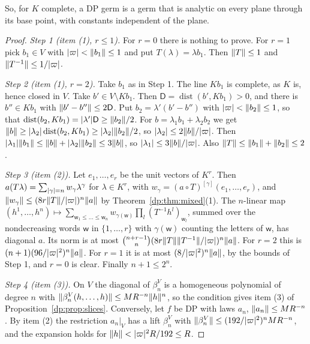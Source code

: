 So, for $K$ complete, a DP germ is a germ that is analytic on every plane through its base point, with constants independent of the plane.

\begin{proof}
\emph{Step 1 (item (1), $r\le1$).} For $r=0$ there is nothing to prove. For $r=1$ pick $b_1\in V$ with $\lvert \varpi\rvert<\lVert b_1\rVert\le1$ and put $T(\lambda)=\lambda b_1$. Then $\lVert T\rVert\le1$ and $\lVert T^{-1}\rVert\le1/\lvert \varpi\rvert$.

\emph{Step 2 (item (1), $r=2$).} Take $b_1$ as in Step 1. The line $Kb_1$ is complete, as $K$ is, hence closed in $V$. Take $b'\in V\setminus Kb_1$. Then $\mathsf D=\operatorname{dist}(b',Kb_1)>0$, and there is $b''\in Kb_1$ with $\lVert b'-b''\rVert\le2\mathsf D$. Put $b_2=\lambda'(b'-b'')$ with $\lvert \varpi\rvert<\lVert b_2\rVert\le1$, so that $\operatorname{dist}(b_2,Kb_1)=\lvert \lambda'\rvert\mathsf D\ge\lVert b_2\rVert/2$. For $b=\lambda_1b_1+\lambda_2b_2$ we get $\lVert b\rVert\ge\lvert \lambda_2\rvert\operatorname{dist}(b_2,Kb_1)\ge\lvert \lambda_2\rvert\lVert b_2\rVert/2$, so $\lvert \lambda_2\rvert\le2\lVert b\rVert/\lvert \varpi\rvert$. Then $\lvert \lambda_1\rvert\lVert b_1\rVert\le\lVert b\rVert+\lvert \lambda_2\rvert\lVert b_2\rVert\le3\lVert b\rVert$, so $\lvert \lambda_1\rvert\le3\lVert b\rVert/\lvert \varpi\rvert$. Also $\lVert T\rVert\le\lVert b_1\rVert+\lVert b_2\rVert\le2$.

\emph{Step 3 (item (2)).} Let $e_1,\dots,e_r$ be the unit vectors of $K^r$. Then $a(T\lambda)=\sum_{\lvert \gamma\rvert=n}w_\gamma\lambda^\gamma$ for $\lambda\in K^r$, with $w_\gamma=(a\circ T)^{[\gamma]}(e_1,\dots,e_r)$, and $\lVert w_\gamma\rVert\le(8r\lVert T\rVert/\lvert \varpi\rvert)^n\lVert a\rVert$ by Theorem~\ref{dp:thm:mixed}(1). The $n$\nobreakdash-linear map $(h^1,\dots,h^n)\mapsto\sum_{\mathsf w_1\le\dots\le\mathsf w_n}w_{\gamma(\mathsf w)}\prod_l(T^{-1}h^l)_{\mathsf w_l}$, summed over the nondecreasing words $\mathsf w$ in $\{1,\dots,r\}$ with $\gamma(\mathsf w)$ counting the letters of $\mathsf w$, has diagonal $a$. Its norm is at most $\binom{n+r-1}n(8r\lVert T\rVert\lVert T^{-1}\rVert/\lvert \varpi\rvert)^n\lVert a\rVert$. For $r=2$ this is $(n+1)(96/\lvert \varpi\rvert^2)^n\lVert a\rVert$. For $r=1$ it is at most $(8/\lvert \varpi\rvert^2)^n\lVert a\rVert$, by the bounds of Step 1, and $r=0$ is clear. Finally $n+1\le2^n$.

\emph{Step 4 (item (3)).} On $V$ the diagonal of $\beta^V_n$ is a homogeneous polynomial of degree $n$ with $\lVert \beta^V_n(h,\dots,h)\rVert\le MR^{-n}\lVert h\rVert^n$, so the condition gives item (3) of Proposition~\ref{dp:prop:slices}. Conversely, let $f$ be DP with laws $a_n$, $\lVert a_n\rVert\le MR^{-n}$. By item (2) the restriction $a_n|_V$ has a lift $\beta^V_n$ with $\lVert \beta^V_n\rVert\le(192/\lvert \varpi\rvert^2)^nMR^{-n}$, and the expansion holds for $\lVert h\rVert<\lvert \varpi\rvert^2R/192\le R$.
\end{proof}

